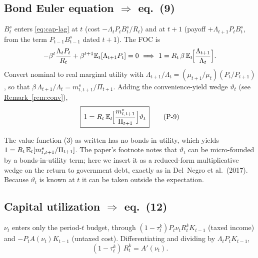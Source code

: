 \subsection{Bond Euler equation \texorpdfstring{$\Rightarrow$}{=>} eq.\ (9)}
$B^s_t$ enters \eqref{eq:cap-lag} at $t$ (cost $-\Lambda_t P_t B^s_t/R_t$) and at $t+1$ (payoff
$+\Lambda_{t+1}P_t B^s_t$, from the term $P_{t-1}B^s_{t-1}$ dated $t+1$). The FOC is
\[
-\beta^t\frac{\Lambda_tP_t}{R_t}+\beta^{t+1}\mathbb{E}_t[\Lambda_{t+1}P_t]=0
\ \Longrightarrow\
1=R_t\,\beta\,\mathbb{E}_t\!\Big[\frac{\Lambda_{t+1}}{\Lambda_t}\Big].
\]
Convert nominal to real marginal utility with $\Lambda_{t+1}/\Lambda_t=(\mu_{t+1}/\mu_t)(P_t/P_{t+1})$,
so that $\beta\,\Lambda_{t+1}/\Lambda_t=m^s_{t,t+1}/\Pi_{t+1}$. Adding the convenience-yield wedge
$\vartheta_t$ (see \hyperref[rem:conv]{Remark~\ref*{rem:conv}}),
\begin{equation}\label{eq:9}
\boxed{\,1=R_t\,\mathbb{E}_t\!\Big[\frac{m^s_{t,t+1}}{\Pi_{t+1}}\Big]\vartheta_t\,}
\tag{P-9}
\end{equation}

\begin{remark}\label{rem:conv}
The value function (3) as written has no bonds in utility, which yields
$1=R_t\,\mathbb{E}_t[m^s_{t,t+1}/\Pi_{t+1}]$. The paper's footnote notes that $\vartheta_t$ can be
micro-founded by a bonds-in-utility term; here we insert it as a reduced-form multiplicative wedge on
the return to government debt, exactly as in Del~Negro et al.\ (2017). Because $\vartheta_t$ is known
at $t$ it can be taken outside the expectation.
\end{remark}

\subsection{Capital utilization \texorpdfstring{$\Rightarrow$}{=>} eq.\ (12)}
$\nu_t$ enters only the period-$t$ budget, through $(1-\tau^k_t)P_t\nu_t R^k_t K_{t-1}$ (taxed income)
and $-P_tA(\nu_t)K_{t-1}$ (untaxed cost). Differentiating and dividing by $\Lambda_t P_t K_{t-1}$,
\begin{equation}\label{eq:util-derived}
(1-\tau^k_t)\,R^k_t=A'(\nu_t).
\end{equation}

